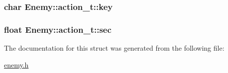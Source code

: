 \subsubsection[{key}]{\setlength{\rightskip}{0pt plus 5cm}char Enemy\+::action\+\_\+t\+::key}\label{structEnemy_1_1action__t_a107762072964a000ee4185e562d5f583}
\hypertarget{structEnemy_1_1action__t_a6098f9876645d5c23c656de57b51e24d}{}
\subsubsection[{sec}]{\setlength{\rightskip}{0pt plus 5cm}float Enemy\+::action\+\_\+t\+::sec}\label{structEnemy_1_1action__t_a6098f9876645d5c23c656de57b51e24d}


The documentation for this struct was generated from the following file\+:\begin{DoxyCompactItemize}
\item 
\hyperlink{enemy_8h}{enemy.\+h}\end{DoxyCompactItemize}

